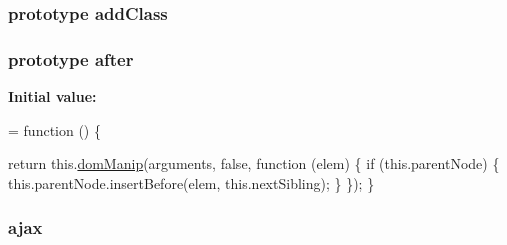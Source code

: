 \subsubsection[{\texorpdfstring{add\+Class}{addClass}}]{ {\bf prototype} add\+Class}\hypertarget{jquery-2_82_81-vsdoc_8js_ac98f6924e42def59f1eb8d3ea1892a8e}{}\label{jquery-2_82_81-vsdoc_8js_ac98f6924e42def59f1eb8d3ea1892a8e}
\subsubsection[{\texorpdfstring{after}{after}}]{ {\bf prototype} after}\hypertarget{jquery-2_82_81-vsdoc_8js_a80413815f48b2c1f574e33fd8a7c3896}{}\label{jquery-2_82_81-vsdoc_8js_a80413815f48b2c1f574e33fd8a7c3896}
{\bfseries Initial value\+:}
\begin{DoxyCode}
= \textcolor{keyword}{function} () \{
        

        \textcolor{keywordflow}{return} this.\hyperlink{jquery-2_82_81-vsdoc_8js_a00a63bd312ef048290dc1755ccb8bae4}{domManip}(arguments, \textcolor{keyword}{false}, \textcolor{keyword}{function} (elem) \{
            \textcolor{keywordflow}{if} (this.parentNode) \{
                this.parentNode.insertBefore(elem, this.nextSibling);
            \}
        \});
    \}
\end{DoxyCode}
\subsubsection[{\texorpdfstring{ajax}{ajax}}]{ ajax}\hypertarget{jquery-2_82_81-vsdoc_8js_a3c9e2ac71a76356869090140308936dc}{}\label{jquery-2_82_81-vsdoc_8js_a3c9e2ac71a76356869090140308936dc}

